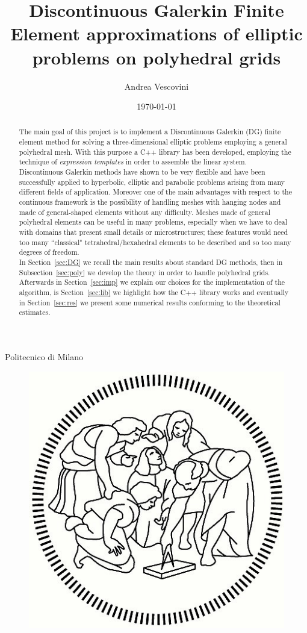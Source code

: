 \documentclass[12pt, a4paper]{article}
\title{\textbf{Discontinuous Galerkin Finite Element approximations of elliptic 
problems on polyhedral grids}}
\author{Andrea Vescovini}
\date{\today}
\theoremstyle{definition}
\theoremstyle{plain}
\theoremstyle{plain}
\theoremstyle{definition}
\begin{document}
\maketitle
\thispagestyle{empty}
\centerline{Politecnico di Milano}
\begin{figure}
	\centering
	\includegraphics[]{Logo.jpg}
\end{figure}
\newpage
\begin{abstract}
	The main goal of this project is to implement a Discontinuous Galerkin (DG) 
	finite element method for solving a three-dimensional elliptic problems
	employing a general polyhedral mesh. With this purpose a C++ library has been developed,
	employing the technique of \emph{expression templates} in order to assemble
	the linear system.\\
	Discontinuous Galerkin methods have shown to be very flexible and have been 
	successfully 
	applied to hyperbolic, elliptic and parabolic problems arising from many 
	different fields of application.
	Moreover one of the main advantages with respect to the continuous 
	framework is the possibility of handling meshes with hanging nodes and made 
	of general-shaped elements without any difficulty. Meshes made of 
	general polyhedral elements can be useful in many problems, especially when 
	we have to deal with domains that present small details or microstructures; 
	these features would need too many ``classical" tetrahedral/hexahedral 
	elements to be described and so too many degrees of freedom.\\
	In Section~\ref{sec:DG} we recall the main results about standard DG 
	methods, then in Subsection~\ref{sec:poly} we develop the theory in order 
	to 
	handle polyhedral grids. Afterwards in Section~\ref{sec:imp} we explain our 
	choices for the implementation of the algorithm, is Section~\ref{sec:lib} we highlight how the C++ library works and
	eventually in Section~\ref{sec:res} 
	we present some numerical results conforming to the theoretical estimates.
\end{abstract}
\end{document}
